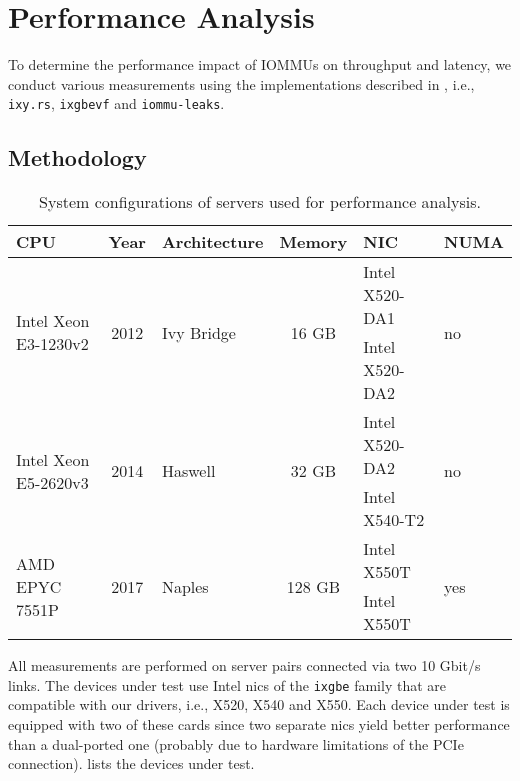 \chapter{Performance Analysis}
\label{chap:performance_analysis}

To determine the performance impact of IOMMUs on throughput and latency, we
conduct various measurements using the implementations described in
, i.e., \texttt{ixy.rs}, \texttt{ixgbevf} and
\texttt{iommu-leaks}.


\section{Methodology}
\label{sec:methodology}

\begin{table}
    \centering
    \begin{tabular}{l|c|l|c|l|l}
    CPU & Year & Architecture & Memory & NIC & NUMA  \\ \hline

    \multirow{2}{*}{Intel Xeon E3-1230v2} & \multirow{2}{*}{2012} &
    \multirow{2}{*}{Ivy Bridge} & \multirow{2}{*}{16 GB} & Intel X520-DA1 &
    \multirow{2}{*}{no} \\
    & & & & Intel X520-DA2 & \\ \hline

    \multirow{2}{*}{Intel Xeon E5-2620v3} & \multirow{2}{*}{2014} &
    \multirow{2}{*}{Haswell} & \multirow{2}{*}{32 GB} & Intel X520-DA2 &
    \multirow{2}{*}{no} \\
    & & & & Intel X540-T2 & \\ \hline

    \multirow{2}{*}{AMD EPYC 7551P} & \multirow{2}{*}{2017} &
    \multirow{2}{*}{Naples} & \multirow{2}{*}{128 GB} & Intel X550T &
    \multirow{2}{*}{yes} \\
    & & & & Intel X550T & \\
    \end{tabular}

    \caption{System configurations of servers used for performance analysis.}
    \label{tab:servers}
\end{table}

All measurements are performed on server pairs connected via two 10 Gbit/s
links. The devices under test use Intel \acp{nic} of the \texttt{ixgbe} family
that are compatible with our drivers, i.e., X520, X540 and X550. Each device
under test is equipped with two of these cards since two separate \acp{nic}
yield better performance than a dual-ported one (probably due to hardware
limitations of the PCIe connection).  lists the devices under
test.

